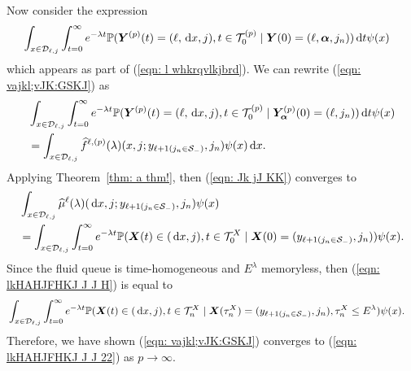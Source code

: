 Now consider the expression 
\begin{align}
	&\int_{x\in\mathcal{D}_{\ell,j}} \int_{t=0}^\infty e^{-\lambda t} \mathbb P({\boldsymbol Y}^{(p)}(t) = (\ell,\, \mathrm{d} x, j),  
	t\in\mathcal T_0^{(p)} \mid \boldsymbol Y(0) = (\ell,\boldsymbol\alpha, j_n)
	 	 )\, \mathrm{d} t  \psi(x)  \label{eqn: vajkl;vJK:GSKJ}
\end{align}
which appears as part of (\ref{eqn: l whkrqvlkjbrd}). We can rewrite (\ref{eqn: vajkl;vJK:GSKJ}) as  
\begin{align}
	 &\int_{x\in\mathcal{D}_{\ell,j}} \int_{t=0}^\infty e^{-\lambda t} \mathbb P({\boldsymbol Y}^{(p)}(t) = (\ell,\, \mathrm{d} x,j), 
	t\in\mathcal T_0^{(p)}\mid \bm{Y}_{\bm{\alpha}}^{(p)}(0) = (\ell,j_n))\, \mathrm{d} t \psi(x) \nonumber 
	 \\&= \int_{x\in\mathcal{D}_{\ell,j}} \widehat f^{\ell,(p)} (\lambda)(x,j;y_{\ell+1(j_n\in\mathcal S_-)},j_n) \psi(x)\, \mathrm{d} x. \label{eqn: Jk jJ KK}
\end{align}
Applying Theorem~\ref{thm: a thm!}, then (\ref{eqn: Jk jJ KK}) converges to 
\begin{align}
	&\int_{x\in\mathcal{D}_{\ell,j}} \widehat \mu^{\ell} (\lambda)(\, \mathrm{d} x,j;y_{\ell+1(j_n\in\mathcal S_-)},j_n) \psi(x) \nonumber 
	\\&= \int_{x\in\mathcal{D}_{\ell,j}} \int_{t=0}^\infty e^{-\lambda t}\mathbb P(\boldsymbol X(t)\in(\, \mathrm{d} x, j), t\in\mathcal T_0^X \mid \boldsymbol X(0) = (y_{\ell+1(j_n\in\mathcal S_-)}, j_n) ) \psi(x). \label{eqn: lkHAHJFHKJ J J H}
\end{align}
Since the fluid queue is time-homogeneous and \(E^\lambda\) memoryless, then (\ref{eqn: lkHAHJFHKJ J J H}) is equal to 
\begin{align}
	&\int_{x\in\mathcal{D}_{\ell,j}} \int_{t=0}^\infty e^{-\lambda t} \mathbb P(\boldsymbol X(t)\in(\, \mathrm{d} x,j), t\in\mathcal T_n^{X} \mid  
	\boldsymbol X(\tau_n^X) = (y_{\ell+1(j_n\in\mathcal S_-)},j_n), \tau_n^X\leq E^\lambda ) \psi(x).  \label{eqn: lkHAHJFHKJ J J 22}
\end{align}
Therefore, we have shown (\ref{eqn: vajkl;vJK:GSKJ}) converges to (\ref{eqn: lkHAHJFHKJ J J 22}) as \(p\to\infty\). 

